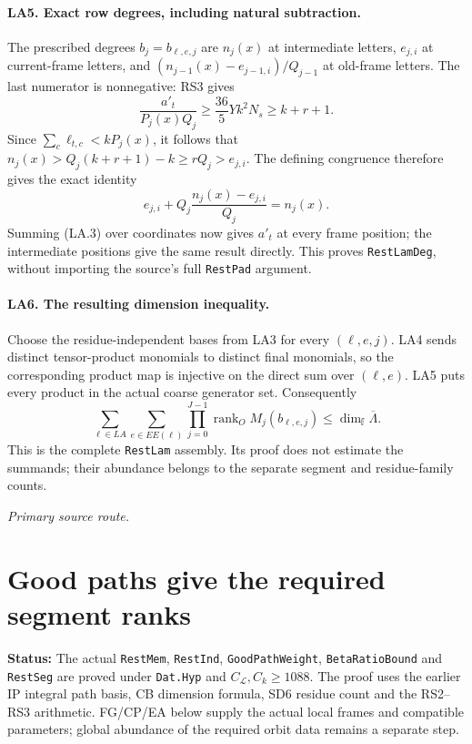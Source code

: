 \documentclass[11pt,a4paper]{article}
\numberwithin{equation}{section}
\theoremstyle{remark}\newtheorem{remark}[theorem]{Remark}
\newcommand{\status}[1]{\textbf{Status:} #1}
\begin{document}
\paragraph{LA5. Exact row degrees, including natural subtraction.}
The prescribed degrees $b_j=b_{\ell,e,j}$ are $n_j(x)$ at intermediate letters, $e_{j,i}$ at current-frame letters, and
$(n_{j-1}(x)-e_{j-1,i})/Q_{j-1}$ at old-frame letters.
The last numerator is nonnegative: RS3 gives
\[
 \frac{a'_t}{P_j(x)Q_j}\ge\frac{36}{5}Yk^2N_s\ge k+r+1.
\]
Since $\sum_c\ell_{t,c}<kP_j(x)$, it follows that
$n_j(x)>Q_j(k+r+1)-k\ge rQ_j>e_{j,i}$.
The defining congruence therefore gives the exact identity
\[
 e_{j,i}+Q_j\frac{n_j(x)-e_{j,i}}{Q_j}=n_j(x).
\]
Summing (LA.3) over coordinates now gives $a'_t$ at every frame position; the intermediate positions give the same result directly.
This proves \texttt{RestLamDeg}, without importing the source's full \texttt{RestPad} argument.

\paragraph{LA6. The resulting dimension inequality.}
Choose the residue-independent bases from LA3 for every $(\ell,e,j)$.
LA4 sends distinct tensor-product monomials to distinct final monomials, so the corresponding product map is injective on the direct sum over $(\ell,e)$.
LA5 puts every product in the actual coarse generator set.
Consequently
\[
 \boxed{\displaystyle
 \sum_{\ell\in LA}\sum_{e\in EE(\ell)}
 \prod_{j=0}^{J-1}\operatorname{rank}_O M_j(b_{\ell,e,j})
 \le\dim_{\mathbb f}\overline\Lambda.} \tag{LA.4}
\]
This is the complete \texttt{RestLam} assembly. Its proof does not estimate the summands; their abundance belongs to the separate segment and residue-family counts.


\noindent\textit{Primary source route.}\cite{segment-assembly}

\section{Good paths give the required segment ranks}
\label{sec:good-paths}

\status{The actual \texttt{RestMem}, \texttt{RestInd},
\texttt{GoodPathWeight}, \texttt{BetaRatioBound} and \texttt{RestSeg}
are proved under \texttt{Dat.Hyp} and $C_{\mathcal L},C_k\geq1088$.
The proof uses the earlier IP integral path basis, CB dimension formula,
SD6 residue count and the RS2--RS3 arithmetic. FG/CP/EA below supply the actual local frames and compatible parameters;
global abundance of the required orbit data remains a separate step.}
\end{document}
